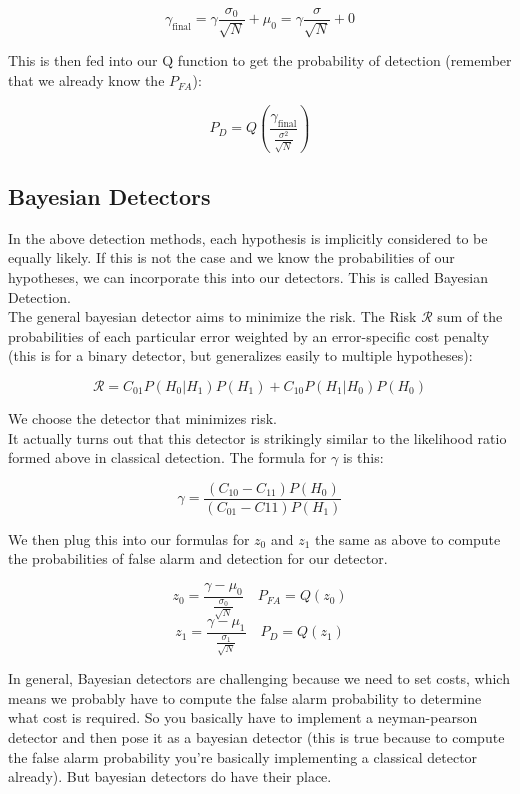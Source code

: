 \documentclass[12pt]{article}
\begin{document}
\[\gamma_{\text{final}} = \gamma \frac{\sigma_0}{\sqrt{N}} + \mu_0 = \gamma \frac{\sigma}{\sqrt{N}}+ 0\]

This is then fed into our Q function to get the probability of detection (remember that we already know the \(P_{FA}\)):

\[P_D = Q\left(\frac{\gamma_{\text{final}}}{\frac{\sigma^2}{\sqrt{N}}} \right)\]
\subsection{Bayesian Detectors}
In the above detection methods, each hypothesis is implicitly considered to  be equally likely. If this is not the case and we know the probabilities of our hypotheses, we can incorporate this into our detectors. This is called Bayesian Detection. \\

The general bayesian detector aims to minimize the risk. The Risk \(\mathcal{R}\) sum of the probabilities of each particular error weighted by an error-specific cost penalty (this is for a binary detector, but generalizes easily to multiple hypotheses):

\[\mathcal{R} = C_{01}P(H_0 | H_1)P(H_1) + C_{10}P(H_1 | H_0)P(H_0)\]

We choose the detector that minimizes risk.\\

It actually turns out that this detector is strikingly similar to the likelihood ratio formed above in classical detection. The formula for \(\gamma\) is this:

\[\gamma = \frac{(C_{10} - C_{11})P(H_0)}{(C_{01} - C{11})P(H_1)}\]

We then plug this into our formulas for \(z_0\) and \(z_1\) the same as above to compute the probabilities of false alarm and detection for our detector.


\[z_0 = \frac{\gamma - \mu_0}{\frac{\sigma_0}{\sqrt{N}}} \quad P_{FA} = Q(z_0)\]
\[z_1 = \frac{\gamma - \mu_1}{\frac{\sigma_1}{\sqrt{N}}} \quad P_{D} = Q(z_1)\]

In general, Bayesian detectors are challenging because we need to set costs, which means we probably have to compute the false alarm probability to determine what cost is required. So you basically have to implement a neyman-pearson detector and then pose it as a bayesian detector (this is true because to compute the false alarm probability you're basically implementing a classical detector already). But bayesian detectors do have their place.
\end{document}
